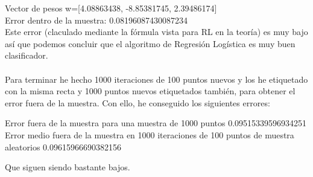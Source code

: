 \documentclass[12pt]{article}
\begin{document}
Vector de pesos w=[4.08863438, -8.85381745,  2.39486174]\\
Error dentro de la muestra:  0.08196087430087234\\
Este error (claculado mediante la fórmula vista para RL en la teoría) es muy bajo así que podemos concluir que el algoritmo de Regresión Logística es muy buen clasificador.\\\\
Para terminar he hecho 1000 iteraciones de 100 puntos nuevos y los he etiquetado con la misma recta y 1000 puntos nuevos etiquetados también, para obtener el error fuera de la muestra. Con ello, he conseguido los siguientes errores:\\
\begin{center}
Error fuera de la muestra para una muestra de 1000 puntos 0.09515339596934251\\
Error medio fuera de la muestra en 1000 iteraciones de 100 puntos de muestra aleatorios 0.09615966690382156
\end{center}
Que siguen siendo bastante bajos.\\
\end{document}
